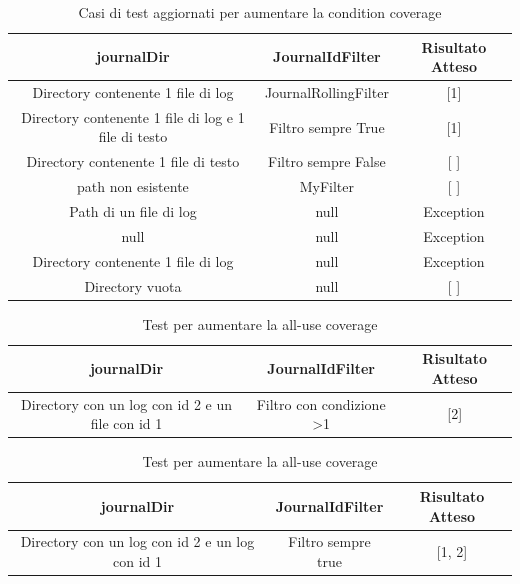\documentclass[12pt, a4paper]{article}
\begin{document}
\begin{table}[ht]
  \centering
  \caption[Journal: Test Suite - Adequacy Control Flow 4]{Casi di test aggiornati per aumentare la condition coverage}
  \begin{tabular}{|c|c|c|}
  \hline
  journalDir & JournalIdFilter & Risultato Atteso \\
  \hline
  {Directory contenente 1 file di log} & JournalRollingFilter & [1] \\
  {Directory contenente 1 file di log e 1 file di testo} & Filtro sempre True & [1] \\
  {Directory contenente 1 file di testo} & Filtro sempre False & [ ] \\
  {path non esistente} & MyFilter & [ ] \\
  {Path di un file di log} & null & Exception \\
  null & null & Exception \\
  {Directory contenente 1 file di log} & null & Exception \\
  {Directory vuota} & null & [ ] \\
  \hline
  \end{tabular}
  \label{tab:ACF4ListJournalIds}
\end{table}

  \begin{table}[ht]
    \centering
    \caption[Journal: Test Suite - Adequacy Data Flow 1]{Test per aumentare la all-use coverage}
    \begin{tabular}{|c|c|c|}
      \hline
      journalDir & JournalIdFilter & Risultato Atteso \\
      \hline
      {Directory con un log con id 2 e un file con id 1} & {Filtro con condizione >1} & [2] \\
      \hline
    \end{tabular}
    \label{tab:ADF1ListJournalIds}
  \end{table}

  \begin{table}[ht]
    \centering
    \caption[Journal: Test Suite - Adequacy Data Flow 1]{Test per aumentare la all-use coverage}
    \begin{tabular}{|c|c|c|}
      \hline
      journalDir & JournalIdFilter & Risultato Atteso \\
      \hline
      {Directory con un log con id 2 e un log con id 1} & {Filtro sempre true} & [1, 2] \\
      \hline
    \end{tabular}
    \label{tab:ADF2ListJournalIds}
  \end{table}
\end{document}
